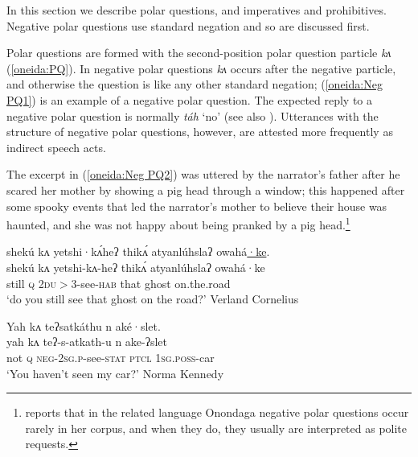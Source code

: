 \documentclass[output=paper,colorlinks,citecolor=brown]{langscibook}
\begin{document}
In this section we describe polar questions, and imperatives and prohibitives. Negative polar questions use standard negation and so are discussed first.

Polar questions are formed with the second-position polar question particle \textit{kʌ} (\ref{oneida:PQ}). In negative polar questions \textit{kʌ} occurs after the negative particle, and otherwise the question is like any other standard negation; (\ref{oneida:Neg PQ1}) is an example of a negative polar question. The expected reply to a negative polar question is normally \textit{táh} `no' (see also ). Utterances with the structure of negative polar questions, however, are attested more frequently as indirect speech acts.

The excerpt in (\ref{oneida:Neg PQ2}) was uttered by the narrator's father after he scared her mother by showing a pig head through a window; this happened after some spooky events that led the narrator's mother to believe their house was haunted, and she was not happy about being pranked by a pig head.\footnote{\citet[394]{Woodbury2018} reports that in the related language Onondaga negative polar questions occur rarely in her corpus, and when they do, they usually are interpreted as polite requests.}

\ea\label{oneida:PQ}
    \glll shekú kʌ yetshi·kʌ́heʔ thikʌ́ atyanlúhslaʔ owahá\uline{·ke}.  \\
    shekú kʌ yetshi-kʌ-heʔ thikʌ́ atyanlúhslaʔ owahá·ke  \\
    still \textsc{q} \textsc{2du$>$3}-see-\textsc{hab} that ghost {on.the.road}\\
    \glt `do you still see that ghost on the road?' Verland Cornelius \citep[67 (21)]{MichelsonEtAl2016}
\z

\ea\label{oneida:Neg PQ1}
    \glll Yah kʌ teʔsatkáthu n aké·slet. \\
    yah kʌ teʔ-s-atkath-u n ake-ʔslet \\
    not \textsc{q} \textsc{neg-2sg.p}-see-\textsc{stat} \textsc{ptcl} \textsc{1sg.poss}-car \\
    \glt `You haven't seen my car?'  Norma Kennedy \citep[133 (27)]{MichelsonEtAl2016}
\z
\end{document}
